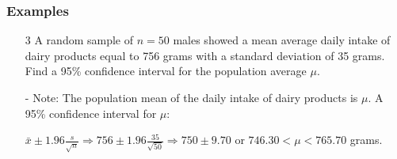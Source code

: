 \documentclass[12pt, letterpaper]{article}
\begin{document}
            \subsubsection*{Examples}
                \begin{itemize}
                    \item[3] A random sample of $n = 50$ males showed a mean average daily intake of dairy products equal to 756 grams with a standard deviation of 35 grams. Find a 95\% confidence interval for the population average $\mu$.
                    \item[-] Note: The population mean of the daily intake of dairy products is $\mu$. A 95\% confidence interval for $\mu$: 
                    \begin{mdframed}[leftmargin=0.5cm,rightmargin=0.5cm]
                        $\bar{x} \pm 1.96\frac{s}{\sqrt{n}} \Rightarrow  756 \pm 1.96\frac{35}{\sqrt{50}} \Rightarrow 750\pm 9.70$ or $746.30 < \mu < 765.70$ grams.
                    \end{mdframed}
                \end{itemize}
\end{document}
